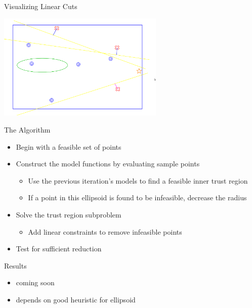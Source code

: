 \documentclass{beamer}
\begin{document}


\begin{frame}{Visualizing Linear Cuts}
\begin{center}
    \includegraphics[width=300px]{images/cut_infeasible_points.png}
\end{center}
\end{frame}



\begin{frame}{The Algorithm}
    \begin{itemize}
        \item Begin with a feasible set of points
        \item Construct the model functions by evaluating sample points
            \begin{itemize}
                \item Use the previous iteration's models to find a feasible inner trust region
                \item If a point in this ellipsoid is found to be infeasible, decrease the radius
            \end{itemize}
        \item Solve the trust region subproblem
            \begin{itemize}
                \item Add linear constraints to remove infeasible points
            \end{itemize}
        \item Test for sufficient reduction
    \end{itemize}
\end{frame}


\begin{frame}{Results}
	\begin{itemize}
		\item coming soon
		\item depends on good heuristic for ellipsoid
	\end{itemize}
\end{frame}
\end{document}
